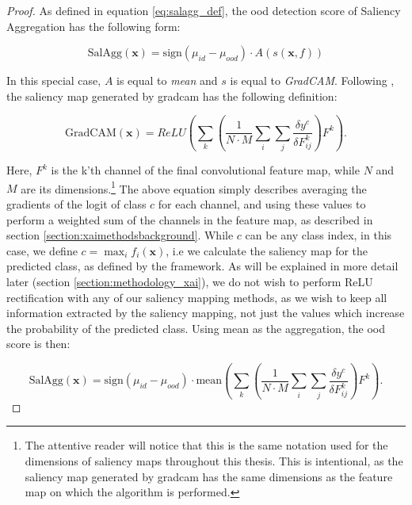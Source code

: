 \documentclass[UKenglish]{uiomasterthesis} %
\theoremstyle{definition}
\begin{document}
\begin{proof}

As defined in equation \ref{eq:salagg_def}, the \ac{ood} detection score of Saliency Aggregation has the following form:

\begin{equation}
    \text{SalAgg}(\bm{x}) = \text{sign}(\mu_{id} - \mu_{ood}) \cdot A(s(\bm{x}, f))
\end{equation}

\noindent In this special case, $A$ is equal to {\it mean} and $s$ is equal to {\it GradCAM}. Following \cite{gradcam}, the saliency map generated by \ac{gradcam} has the following definition:

\begin{equation}
    \text{GradCAM}(\bm{x}) = ReLU\left(\sum_k \left( \frac{1}{N \cdot M} \sum_i \sum_j \frac{\delta y^c}{\delta F_{ij}^k} \right) F^k \right).
\end{equation}

\noindent Here, $F^k$ is the k'th channel of the final convolutional feature map, while $N$ and $M$ are its dimensions.\footnote{The attentive reader will notice that this is the same notation used for the dimensions of saliency maps throughout this thesis. This is intentional, as the saliency map generated by \ac{gradcam} has the same dimensions as the feature map on which the algorithm is performed.} The above equation simply describes averaging the gradients of the logit of class $c$ for each channel, and using these values to perform a weighted sum of the channels in the feature map, as described in section \ref{section:xaimethodsbackground}. While $c$ can be any class index, in this case, we define $c = \max_i f_i(\bm{x})$, i.e we calculate the saliency map for the predicted class, as defined by the framework. As will be explained in more detail later (section \ref{section:methodology_xai}), we do not wish to perform ReLU rectification with any of our saliency mapping methods, as we wish to keep all information extracted by the saliency mapping, not just the values which increase the probability of the predicted class. Using mean as the aggregation, the \ac{ood} score is then:

\begin{equation}
    \text{SalAgg}(\bm{x}) = \text{sign}(\mu_{id} - \mu_{ood}) \cdot \text{mean} \left(\sum_k \left( \frac{1}{N \cdot M} \sum_i \sum_j \frac{\delta y^c}{\delta F_{ij}^k} \right) F^k \right).
\end{equation}


\end{proof}
\end{document}

